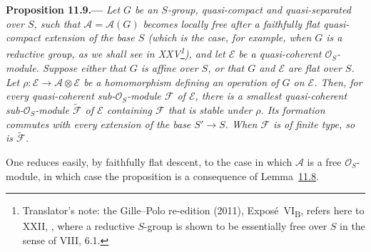 \medskip
{}\label{prop:sga3-VIB-11.9}%
\noindent\textbf{Proposition 11.9.---}
\emph{Let \(G\) be an \(S\)-group, quasi-compact and
quasi-separated over \(S\), such that
\(\mathcal A=\mathcal A(G)\) becomes locally free after a
faithfully flat quasi-compact extension of the base \(S\)
\textup{(}which is the case, for example, when \(G\) is a
reductive group, as we shall see in XXV\footnote{Translator's note: the
Gille--Polo re-edition (2011), Expos\'e~VI\textsubscript{B}, refers here to XXII,
, where a reductive \(S\)-group is shown to be essentially free over
\(S\) in the sense of VIII, 6.1.}\textup{)}, and let
\(\mathcal E\) be a quasi-coherent \(\mathcal O_S\)-module.
Suppose either that \(G\) is affine over \(S\), or that \(G\)
and \(\mathcal E\) are flat over \(S\). Let
\(\rho:\mathcal E\to\mathcal A\otimes\mathcal E\) be a
homomorphism defining an operation of \(G\) on \(\mathcal E\).
Then, for every quasi-coherent sub-\(\mathcal O_S\)-module
\(\mathcal F\) of \(\mathcal E\), there is a smallest
quasi-coherent sub-\(\mathcal O_S\)-module
\(\widetilde{\mathcal F}\) of \(\mathcal E\) containing
\(\mathcal F\) that is stable under \(\rho\). Its formation
commutes with every extension of the base \(S'\to S\). When
\(\mathcal F\) is of finite type, so is
\(\widetilde{\mathcal F}\).}

One reduces easily, by faithfully flat descent, to the case in
which \(\mathcal A\) is a free \(\mathcal O_S\)-module, in which
case the proposition is a consequence of Lemma~\hyperref[lem:sga3-VIB-11.8]{11.8}.


